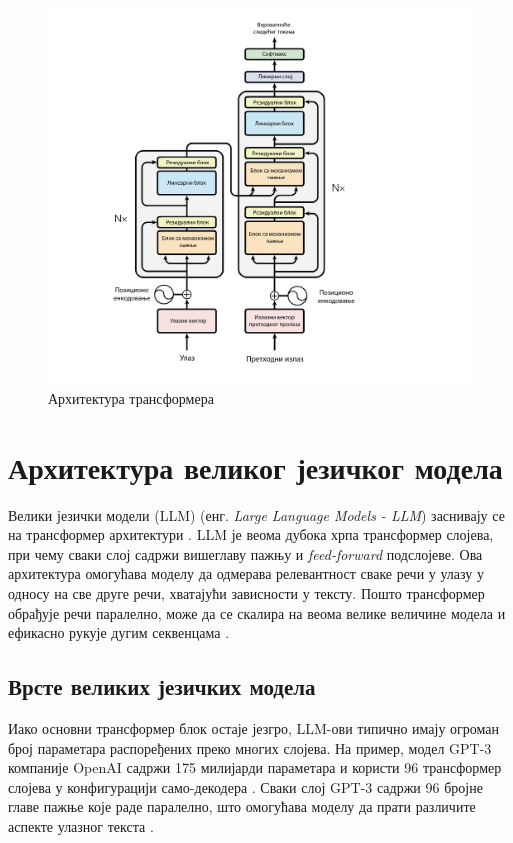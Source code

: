 \begin{figure}[h]
    \centering
    \includegraphics[width=1.0\textwidth]{images/transformer.png}
    \caption{Архитектура трансформера}
    \label{fig:transformer}
\end{figure}

\section{Архитектура великог језичког модела}
\label{sec:llm_architecture}

Велики језички модели (LLM) (енг. \textit{Large Language Models - LLM}) заснивају се на трансформер архитектури \cite{vaswani_attention_2017}. LLM је веома дубока хрпа трансформер слојева, при чему сваки слој садржи вишеглаву пажњу и \textit{feed-forward} подслојеве. Ова архитектура омогућава моделу да одмерава релевантност сваке речи у улазу у односу на све друге речи, хватајући зависности у тексту. Пошто трансформер обрађује речи паралелно, може да се скалира на веома велике величине модела и ефикасно рукује дугим секвенцама \cite{vaswani_attention_2017}.

\subsection{Врсте великих језичких модела}

Иако основни трансформер блок остаје језгро, LLM-ови типично имају огроман број параметара распоређених преко многих слојева. На пример, модел GPT-3 компаније OpenAI садржи 175 милијарди параметара и користи 96 трансформер слојева у конфигурацији само-декодера \cite{brown_language_2020}. Сваки слој GPT-3 садржи 96 бројне главе пажње које раде паралелно, што омогућава моделу да прати различите аспекте улазног текста \cite{brown_language_2020}.

